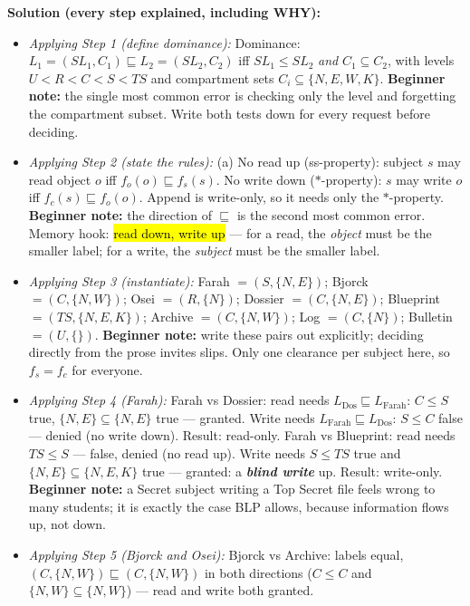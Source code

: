 \documentclass[12pt, a4paper]{article}
\newcommand{\term}[1]{\textbf{\textit{#1}}}        %
\newcommand{\imp}[1]{\hl{#1}}                       %
\begin{document}
\textbf{Solution (every step explained, including WHY):}
\begin{itemize}
    \item \textit{Applying Step 1 (define dominance):} Dominance: $L_1 = (SL_1, C_1) \sqsubseteq L_2 = (SL_2, C_2)$ iff $SL_1 \leq SL_2$ \emph{and} $C_1 \subseteq C_2$, with levels $U < R < C < S < TS$ and compartment sets $C_i \subseteq \{N, E, W, K\}$.
    \textbf{Beginner note:} the single most common error is checking only the level and forgetting the compartment subset. Write both tests down for every request before deciding.
    \item \textit{Applying Step 2 (state the rules):} (a) No read up (ss-property): subject $s$ may read object $o$ iff $f_o(o) \sqsubseteq f_s(s)$. No write down ($*$-property): $s$ may write $o$ iff $f_c(s) \sqsubseteq f_o(o)$.
    Append is write-only, so it needs only the $*$-property. \textbf{Beginner note:} the direction of $\sqsubseteq$ is the second most common error.
    Memory hook: \imp{read down, write up} --- for a read, the \emph{object} must be the smaller label; for a write, the \emph{subject} must be the smaller label.
    \item \textit{Applying Step 3 (instantiate):} Farah $= (S, \{N,E\})$; Bjorck $= (C, \{N,W\})$; Osei $= (R, \{N\})$; Dossier $= (C, \{N,E\})$; Blueprint $= (TS, \{N,E,K\})$; Archive $= (C, \{N,W\})$; Log $= (C, \{N\})$; Bulletin $= (U, \{\})$.
    \textbf{Beginner note:} write these pairs out explicitly; deciding directly from the prose invites slips. Only one clearance per subject here, so $f_s = f_c$ for everyone.
    \item \textit{Applying Step 4 (Farah):} Farah vs Dossier: read needs $L_{\text{Dos}} \sqsubseteq L_{\text{Farah}}$: $C \leq S$ true, $\{N,E\} \subseteq \{N,E\}$ true --- granted.
    Write needs $L_{\text{Farah}} \sqsubseteq L_{\text{Dos}}$: $S \leq C$ false --- denied (no write down). Result: read-only.
    Farah vs Blueprint: read needs $TS \leq S$ --- false, denied (no read up). Write needs $S \leq TS$ true and $\{N,E\} \subseteq \{N,E,K\}$ true --- granted: a \term{blind write} up.
    Result: write-only. \textbf{Beginner note:} a Secret subject writing a Top Secret file feels wrong to many students; it is exactly the case BLP allows, because information flows up, not down.
    \item \textit{Applying Step 5 (Bjorck and Osei):} Bjorck vs Archive: labels equal, $(C, \{N,W\}) \sqsubseteq (C, \{N,W\})$ in both directions ($C \leq C$ and $\{N,W\} \subseteq \{N,W\}$) --- read and write both granted.

\end{itemize}
\end{document}
